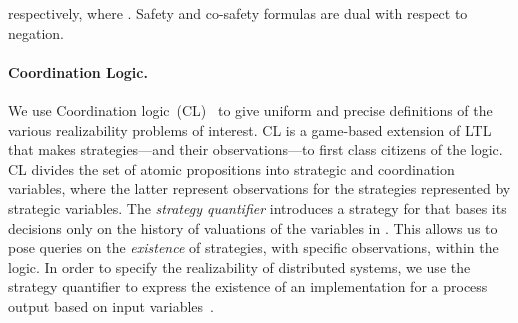 \documentclass{LMCS}
\theoremstyle{plain}\newtheorem{theorem}[thm]{Theorem}
\theoremstyle{plain}\newtheorem{lemma}[thm]{Lemma}
\theoremstyle{plain}\newtheorem{proposition}[thm]{Proposition}
\theoremstyle{plain}\newtheorem{corollary}[thm]{Corollary}
\theoremstyle{definition}\newtheorem{definition}{Definition}[section]
\begin{document}
respectively, where .
Safety and co-safety formulas are dual with respect to negation.

\paragraph{\bf Coordination Logic.}
We use  Coordination logic~(CL)~\cite{DBLP:conf/csl/FinkbeinerS10} to give uniform and precise definitions of the various realizability problems of interest.
CL is a game-based extension of LTL that makes strategies---and their observations---to first class citizens of the logic.
CL divides the set of atomic propositions into strategic and coordination variables, where the latter represent observations for the strategies represented by strategic variables.
The \emph{strategy quantifier}  introduces a strategy for  that bases its decisions only on the history of valuations of the variables in .
This allows us to pose queries on the \emph{existence} of strategies, with specific observations, within the logic.
In order to specify the realizability of distributed systems, we use the strategy quantifier  to express the existence of an implementation for a process output  based on input variables~.
\end{document}
